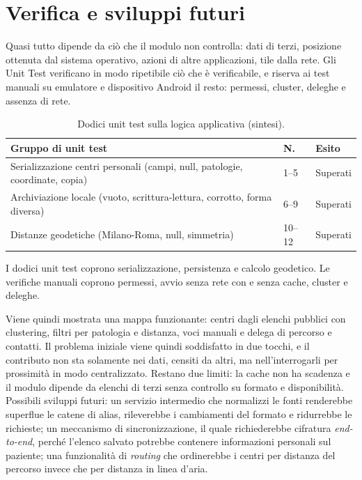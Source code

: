 \documentclass[a4paper, oneside, openright]{book}
\renewcommand{\footnotesize}{\fontsize{11pt}{13pt}\selectfont} %
\begin{document}
\section{Verifica e sviluppi futuri}\label{sec:sintesi-verifica}

Quasi tutto dipende da ci\`o che il modulo non controlla: dati di terzi,
posizione ottenuta dal sistema operativo, azioni di altre applicazioni, tile
dalla rete.
Gli Unit Test verificano in modo ripetibile ci\`o che \`e
verificabile, e riserva ai test manuali su emulatore e dispositivo
Android il resto: permessi, cluster, deleghe e assenza di rete.

\begin{table}[H]
\centering
\footnotesize
\begin{tabularx}{\textwidth}{@{}P{4.6cm} P{1.2cm} P{1.6cm}@{}}
\toprule
\textbf{Gruppo di unit test} & \textbf{N.} & \textbf{Esito} \tabularnewline
\midrule
Serializzazione centri personali (campi, null, patologie, coordinate, copia) & 1--5 & Superati \tabularnewline
Archiviazione locale (vuoto, scrittura-lettura, corrotto, forma diversa) & 6--9 & Superati \tabularnewline
Distanze geodetiche (Milano-Roma, null, simmetria) & 10--12 & Superati \tabularnewline
\bottomrule
\end{tabularx}
\caption{Dodici unit test sulla logica applicativa (sintesi).}
\label{tab:sintesi-test}
\end{table}

I dodici unit test coprono serializzazione, persistenza e calcolo
geodetico. %
Le verifiche manuali coprono permessi, avvio senza rete con e senza cache,
cluster e deleghe. %

Viene quindi mostrata una mappa funzionante: centri dagli elenchi pubblici con
clustering, filtri per patologia e distanza, voci manuali e delega di
percorso e contatti.
Il problema iniziale viene quindi soddisfatto in due tocchi, e il
contributo non sta solamente nei dati, censiti da altri, ma nell'interrogarli per
prossimit\`a in modo centralizzato.
Restano due limiti: la cache non ha scadenza e il modulo dipende da
elenchi di terzi senza controllo su formato e disponibilit\`a.
Possibili sviluppi futuri: un servizio intermedio che
normalizzi le fonti renderebbe superflue le catene di alias,
rileverebbe i cambiamenti del formato e ridurrebbe le richieste; un meccanismo di sincronizzazione, il quale
richiederebbe cifratura \textit{end-to-end}, perch\'e
l'elenco salvato potrebbe contenere informazioni personali sul paziente; una funzionalità di \textit{routing}
che ordinerebbe i centri per distanza del percorso invece che per distanza in linea d'aria.
\end{document}
